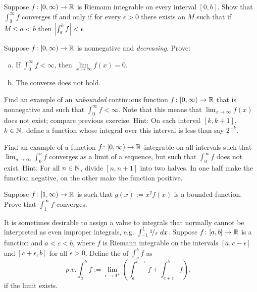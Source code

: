 \begin{exercise}
Suppose $f \colon [0,\infty) \to {\mathbb{R}}$ is Riemann integrable on every interval
$[0,b]$.  Show that  $\int_0^\infty f$ converges if and only if
for every $\epsilon > 0$ there exists an $M$ such that if $M \leq a < b$
then $\left\lvert {\int_a^b f} \right\rvert < \epsilon$.
\end{exercise}

\begin{exercise}
Suppose $f \colon [0,\infty) \to {\mathbb{R}}$ is nonnegative and
\emph{decreasing}.  Prove:
\begin{enumerate}[a)]
\item
If $\int_0^\infty f < \infty$, then $\lim\limits_{x\to\infty} f(x) = 0$.
\item
The converse does not hold.
\end{enumerate}
\end{exercise}

\begin{exercise}
Find an example of an \emph{unbounded} continuous function $f \colon
[0,\infty) \to {\mathbb{R}}$ that is nonnegative and such that $\int_0^\infty f < \infty$.
Note that this means that $\lim_{x\to\infty} f(x)$ does not exist; compare
previous exercise.
Hint: On each interval $[k,k+1]$, $k \in {\mathbb{N}}$, define a function whose
integral over this interval is less than say $2^{-k}$.
\end{exercise}

\begin{exercise}
Find an example of a function $f \colon [0,\infty) \to {\mathbb{R}}$ integrable on all
intervals such that $\lim_{n\to\infty} \int_0^n f$ converges as a
limit of a sequence, but such that
$\int_0^\infty f$ does not exist.
Hint: For all $n\in {\mathbb{N}}$, divide $[n,n+1]$ into two halves.  In one half
make the function negative, on the other make the function positive.
\end{exercise}

\begin{exercise}
Suppose $f \colon [1,\infty) \to {\mathbb{R}}$ is such that
$g(x) := x^2 f(x)$ is a bounded function. Prove that
$\int_1^\infty f$ converges.
\end{exercise}

\begin{exnote}
It is sometimes desirable to assign a value to integrals that normally
cannot be interpreted as even improper integrals,
e.g.\ $\int_{-1}^1 \nicefrac{1}{x}~dx$.
Suppose $f \colon [a,b] \to {\mathbb{R}}$ is a function and $a < c < b$,
where $f$ is Riemann integrable on the intervals
$[a,c-\epsilon]$ and $[c+\epsilon,b]$ for all $\epsilon > 0$.
Define
the \emph{} of $\int_a^b f$ as
\begin{equation*}
p.v.\!\int_a^b f := \lim_{\epsilon\to 0^+}
\left(
\int_a^{c-\epsilon} f + 
\int_{c+\epsilon}^b f
\right) ,
\end{equation*}
if the limit exists.
\end{exnote}

